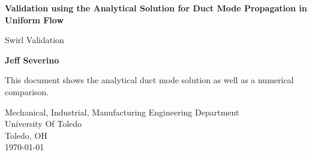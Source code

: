 \documentclass[a4paper]{report}
\begin{document}
\begin{titlepage}
    \begin{center}
        \vspace*{1cm}

        \textbf{ Validation using the %
            Analytical Solution for Duct Mode Propagation in %
        Uniform Flow} 

        \vspace{0.5cm}
        Swirl Validation

        \vspace{1.5cm}

        \textbf{Jeff Severino}

        \vfill


        This document shows the analytical duct mode solution as well as a
        numerical comparison.
        \vspace{0.8cm}


        Mechanical, Industrial, Manufacturing Engineering Department\\
        University Of Toledo\\
        Toledo, OH\\
        \today

    \end{center}
\end{titlepage}



\end{document}
